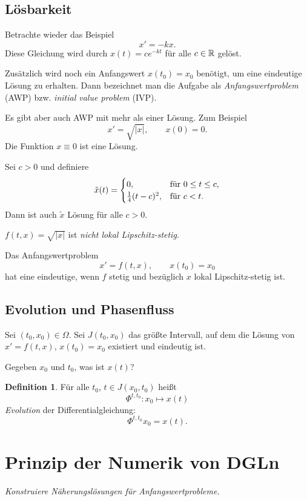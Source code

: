 \documentclass[
 a4paper,
 12pt,
 parskip=half
 ]{scrreprt}
\theoremstyle{plain}
\theoremstyle{definition}
\numberwithin{rmrk}{chapter}
\numberwithin{defn}{chapter}
\numberwithin{exmp}{chapter}
\numberwithin{prgp}{subsection}
\newtheorem*{defn*}{Definition}
\numberwithin{equation}{chapter}
\begin{document}
\subsection{Lösbarkeit}
Betrachte wieder das Beispiel
\[ x' = -kx. \]
Diese Gleichung wird durch $x(t) = c e^{-kt}$ für alle $c \in \mathbb{R}$ gelöst.

Zusätzlich wird noch ein Anfangswert $x(t_0) = x_0$ benötigt, um eine eindeutige
Lösung zu erhalten. Dann bezeichnet man die Aufgabe als
\emph{Anfangswertproblem} (AWP) bzw. \emph{initial value problem} (IVP).

Es gibt aber auch AWP mit mehr als einer Lösung. Zum Beispiel
\[ x' = \sqrt{|x|}, \qquad x(0) = 0. \]
Die Funktion $x \equiv 0$ ist eine Lösung.

Sei $c > 0$ und definiere
\[ \tilde{x}(t) = \begin{cases}
    0, &\text{für } 0 \le t \le c, \\
    \frac{1}{4}(t-c)^2, & \text{für } c < t.
  \end{cases}
\]
Dann ist auch $\tilde{x}$ Lösung für alle $c > 0$.

$f(t,x) = \sqrt{|x|}$ ist \emph{nicht lokal Lipschitz-stetig}.

\begin{thm}
  Das Anfangswertproblem
  \[ x' = f(t,x), \qquad x(t_0) = x_0\]
  hat eine eindeutige, wenn $f$ stetig und bezüglich $x$ lokal Lipschitz-stetig
  ist.
\end{thm}

\subsection{Evolution und Phasenfluss}
Sei $(t_0, x_0) \in \Omega$. Sei $J(t_0, x_0)$ das größte Intervall, auf dem die
Lösung von $x' = f(t,x)$, $x(t_0) = x_0$ existiert und eindeutig ist.

Gegeben $x_0$ und $t_0$, was ist $x(t)$?

\begin{defn*}
  Für alle $t_0$, $t \in J(x_0, t_0)$ heißt
  \[ \Phi^{t,t_0} : x_0 \mapsto x(t) \]
  \emph{Evolution} der Differentialgleichung:
  \[ \Phi^{t,t_0} x_0 = x(t). \]
\end{defn*}

\section{Prinzip der Numerik von DGLn}
\emph{Konstruiere Näherungslösungen für Anfangswertprobleme.}
\end{document}
